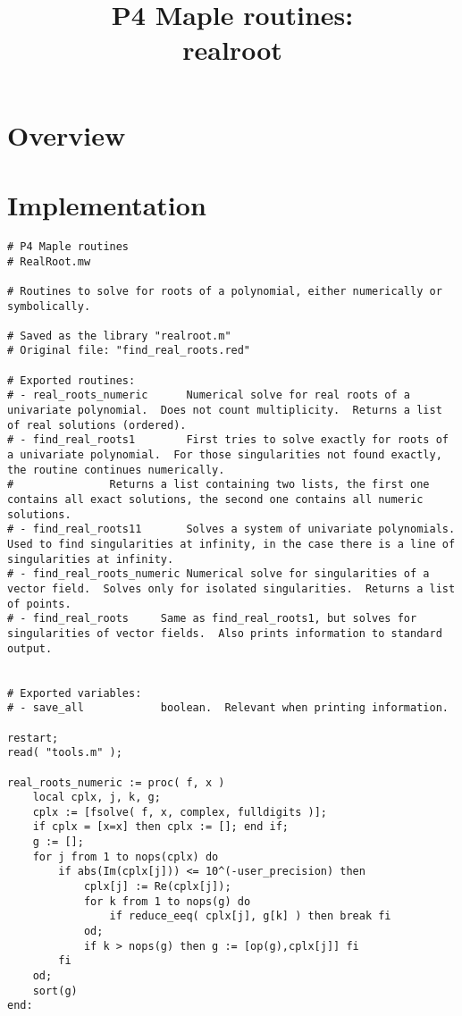 \documentclass[a4paper,10pt]{article}
\title{P4 Maple routines:\\realroot}
\author{}
\date{}
\begin{document}
\maketitle

\section{Overview}

\section{Implementation}

\begin{lstlisting}[name=realroot]
# P4 Maple routines
# RealRoot.mw

# Routines to solve for roots of a polynomial, either numerically or symbolically.

# Saved as the library "realroot.m"
# Original file: "find_real_roots.red"

# Exported routines:
# - real_roots_numeric      Numerical solve for real roots of a univariate polynomial.  Does not count multiplicity.  Returns a list of real solutions (ordered).
# - find_real_roots1        First tries to solve exactly for roots of a univariate polynomial.  For those singularities not found exactly, the routine continues numerically.
#               Returns a list containing two lists, the first one contains all exact solutions, the second one contains all numeric solutions.
# - find_real_roots11       Solves a system of univariate polynomials.  Used to find singularities at infinity, in the case there is a line of singularities at infinity.
# - find_real_roots_numeric Numerical solve for singularities of a vector field.  Solves only for isolated singularities.  Returns a list of points.
# - find_real_roots     Same as find_real_roots1, but solves for singularities of vector fields.  Also prints information to standard output.


# Exported variables:
# - save_all            boolean.  Relevant when printing information.

restart;
read( "tools.m" );

real_roots_numeric := proc( f, x )
    local cplx, j, k, g;
    cplx := [fsolve( f, x, complex, fulldigits )];
    if cplx = [x=x] then cplx := []; end if;
    g := [];
    for j from 1 to nops(cplx) do
        if abs(Im(cplx[j])) <= 10^(-user_precision) then
            cplx[j] := Re(cplx[j]);
            for k from 1 to nops(g) do
                if reduce_eeq( cplx[j], g[k] ) then break fi
            od;
            if k > nops(g) then g := [op(g),cplx[j]] fi
        fi
    od;
    sort(g)
end:


\end{lstlisting}
\end{document}
